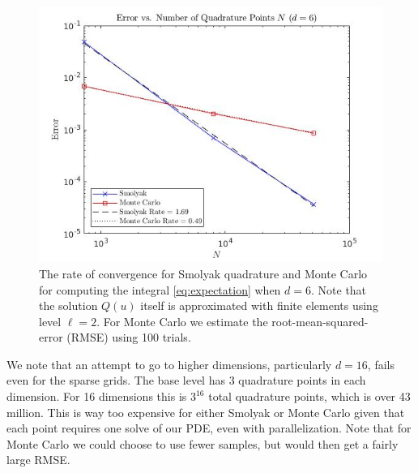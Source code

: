 \documentclass[12pt]{article}
\begin{document}
\begin{enumerate}
\begin{figure}[H]
\centering
\includegraphics[width=5in]{smolyak_mc_error_d6.jpg}
\caption{The rate of convergence for Smolyak quadrature and Monte Carlo for computing the integral \ref{eq:expectation} when $d=6$. Note that the solution $Q(u)$ itself is approximated with finite elements using level $\ell = 2$.  For Monte Carlo we estimate the root-mean-squared-error (RMSE) using 100 trials.}
\label{fig:comparisond6}
\end{figure}


\hspace{0.5cm}  We note that an attempt to go to higher dimensions, particularly $d=16$, fails even for the sparse grids.  The base level has $3$ quadrature points in each dimension.  For 16 dimensions this is $3^{16}$ total quadrature points, which is over 43 million.  This is way too expensive for either Smolyak or Monte Carlo given that each point requires one solve of our PDE, even with parallelization.  Note that for Monte Carlo we could choose to use fewer samples, but would then get a fairly large RMSE.


\end{enumerate}
\end{document}

